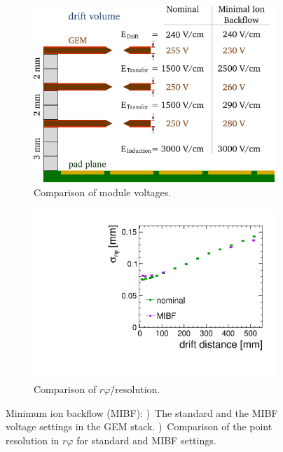 \begin{figure}[tbhp!]
\begin{subfigure}[b]{0.52\textwidth}
\includegraphics[width=\textwidth]{Tracker/TPC_Bonn/plots/TPC-DG_gem-voltages-nominal-mib.pdf}
\caption{Comparison of module voltages.}
\label{sfig:voltages_nom-mib}
\end{subfigure}%
\begin{subfigure}[b]{0.48\textwidth}
\includegraphics[width=\textwidth]{Tracker/TPC_Bonn/plots/TPC-DG_rphiResolution_IBF_v2.pdf}
\caption{Comparison of $r\varphi$\=/resolution.}
\label{sfig:rphires_mibf}
\end{subfigure}
\caption{Minimum ion backflow (MIBF):
  \protect{})~The standard and the MIBF voltage settings in the GEM stack.
  \protect{})~Comparison of the point resolution in $r\varphi$ for standard and MIBF settings.}
\label{fig:mibf}
\end{figure}

